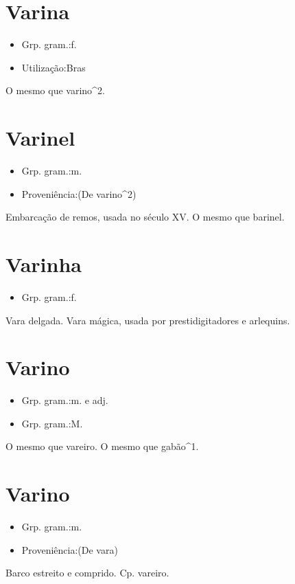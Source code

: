 \documentclass{article}
\begin{document}
\section{Varina}
\begin{itemize}
\item {Grp. gram.:f.}
\end{itemize}
\begin{itemize}
\item {Utilização:Bras}
\end{itemize}
O mesmo que \textunderscore varino\textunderscore ^2.
\section{Varinel}
\begin{itemize}
\item {Grp. gram.:m.}
\end{itemize}
\begin{itemize}
\item {Proveniência:(De \textunderscore varino\textunderscore ^2)}
\end{itemize}
Embarcação de remos, usada no século XV.
O mesmo que \textunderscore barinel\textunderscore .
\section{Varinha}
\begin{itemize}
\item {Grp. gram.:f.}
\end{itemize}
Vara delgada.
Vara mágica, usada por prestidigitadores e arlequins.
\section{Varino}
\begin{itemize}
\item {Grp. gram.:m.  e  adj.}
\end{itemize}
\begin{itemize}
\item {Grp. gram.:M.}
\end{itemize}
O mesmo que \textunderscore vareiro\textunderscore .
O mesmo que \textunderscore gabão\textunderscore ^1.
\section{Varino}
\begin{itemize}
\item {Grp. gram.:m.}
\end{itemize}
\begin{itemize}
\item {Proveniência:(De \textunderscore vara\textunderscore )}
\end{itemize}
Barco estreito e comprido.
Cp. \textunderscore vareiro\textunderscore .
\end{document}
